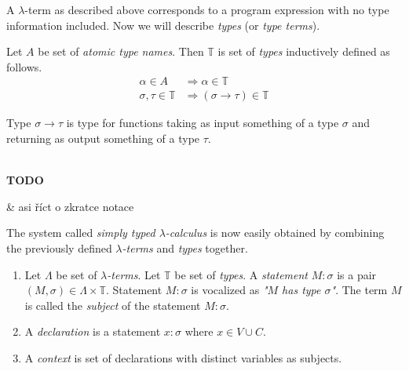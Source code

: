 \documentclass{llncs}
\newcommand{\lterm}{$\lambda$-term\xspace}
\newcommand{\lterms}{$\lambda$-terms\xspace}
\newcommand{\then}{\Rightarrow\xspace}
\newcommand{\ar}{\rightarrow\xspace}
\newcommand{\T}{\mathbb{T}\xspace}
\newenvironment{todo}
{~\\ {\color{red}\textbf{TODO}}
  \begin{easylist}[itemize]}
{ \end{easylist}}
\begin{document}

A \lterm as described above
corresponds to a program expression with no type information
included. Now we will describe \textit{types} (or \textit{type terms}).

\begin{definition}
Let $A$ be set of {\it atomic type names}. 
Then $\mathbb{T}$ is set of {\it types} inductively defined as follows.
\begin{align*}
\alpha      \in A  &\then   \alpha \in \T \\
\sigma,\tau \in \T &\then ( \sigma \ar  \tau ) \in \T 
\end{align*}
\end{definition}

Type $\sigma \ar \tau$ is type for functions taking as input
something of a type $\sigma$ and returning 
as output something of a type $\tau$. 

\begin{todo}
 & asi říct o zkratce notace
\end{todo}


The system called \textit{simply typed $\lambda$-calculus} is now easily obtained by
combining the previously defined \textit{\lterms} and \textit{types} together. 





\begin{definition}\begin{enumerate}
 \item 	Let $\Lambda$ be set of {\it \lterms}. 
	Let $\mathbb{T}$ be set of {\it types}.       
	A {\it statement} $M : \sigma$ is a pair 
	$(M,\sigma) \in \Lambda \times \mathbb{T}$.
	Statement $M : \sigma$ is vocalized as 
	{\it "$M$ has type $\sigma$"}.
	The term $M$ is called the {\it subject} of the 
	statement $M : \sigma$.
 \item A \textit{declaration} is a statement 
 $x : \sigma$ where $x \in V \cup C$.
  
 \item A \textit{context} 
 is set of declarations with distinct variables as subjects.
\end{enumerate}
\end{definition}
\end{document}
